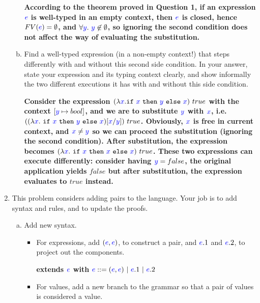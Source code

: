 \documentclass{article}
\newcommand{\meta}[1]{{\color{blue}#1}}
\begin{document}
\begin{enumerate}[leftmargin=*,itemindent=*,start=1,label={{\bf Problem \arabic*}.},ref=\arabic*]
\begin{enumerate}[(a)]
    \textbf{According to the theorem proved in Question 1, if an expression $\meta{e}$ is well-typed in an empty context, then $\meta{e}$ is closed, hence $FV(\meta{e}) = \emptyset$, and $\forall \meta{y}.\ \meta{y}\not\in \emptyset$, so ignoring the second condition does not affect the way of evaluating the substitution.}

  \item Find a well-typed expression (in a non-empty context!) that steps
    differently with and without this second side condition.  In your answer,
    state your expression and its typing context clearly, and show informally
    the two different executions it has with and without this side condition.

    \textbf{Consider the expression $(\lambda\meta{x}. \texttt{if}\ \meta{x}\ \texttt{then}\ \meta{y}\ \texttt{else}\ \meta{x})\ true$ with the context $\lbrack \meta{y}\mapsto bool \rbrack$, and we are to substitute $\meta{y}$ with $\meta{x}$, i.e. $((\lambda\meta{x}.\ \texttt{if}\ \meta{x}\ \texttt{then}\ \meta{y}\ \texttt{else}\ \meta{x})\lbrack \meta{x} / \meta{y} \rbrack)\ true$. Obviously, $\meta{x}$ is free in current context, and $\meta{x} \neq \meta{y}$ so we can proceed the substitution (ignoring the second condition). After substitution, the expression becomes $(\lambda\meta{x}.\ \texttt{if}\ \meta{x}\ \texttt{then}\ \meta{x}\ \texttt{else}\ \meta{x})\ true$. These two expressions can execute differently: consider having $\meta{y} = false$, the original application yields $false$ but after substitution, the expression evaluates to $true$ instead.}

  \end{enumerate}
\item This problem considers adding pairs to the language. Your job is to add syntax and rules, and to update the proofs.
  \begin{enumerate}[(a)]
  \item Add new syntax.
    \begin{itemize}
    \item For expressions, add $(\meta{e}, \meta{e})$, to construct a pair, and
      $\meta{e}.1$ and $\meta{e}.2$, to project out the components.

      \textbf{extends $\meta{e}$ with}
      $\meta{e} ::= (\meta{e}, \meta{e})\ |\ \meta{e}.1\ |\ \meta{e}.2$

    \item For values, add a new branch to the grammar so that a pair of
      values is considered a value.


\end{itemize}
\end{enumerate}
\end{enumerate}
\end{document}

